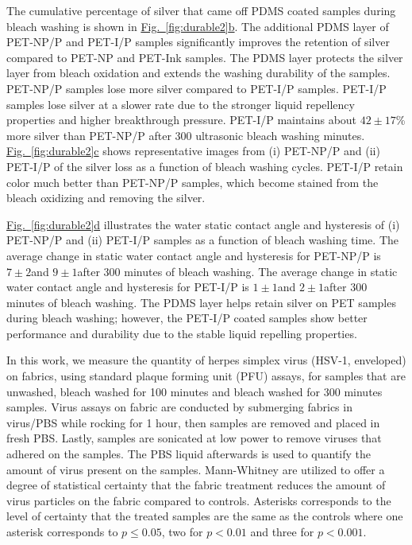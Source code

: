 \documentclass[journal=jacsat,manuscript=article]{achemso}
\newcommand{\figref}[2][]{\hyperref[#2]{Fig.~\ref{#2}#1}}
\begin{document}
The cumulative percentage of silver that came off PDMS coated samples during bleach washing is shown in \figref[b]{fig:durable2}. The additional PDMS layer of PET-NP/P and PET-I/P samples significantly improves the retention of silver compared to PET-NP and PET-Ink samples. The PDMS layer protects the silver layer from bleach oxidation and extends the washing durability of the samples. PET-NP/P samples lose more silver compared to PET-I/P samples. PET-I/P samples lose silver at a slower rate due to the stronger liquid repellency properties and higher breakthrough pressure. PET-I/P maintains about $42 \pm 17$\% more silver than PET-NP/P after 300 ultrasonic bleach washing minutes. 
\figref[c]{fig:durable2} shows representative images from (i) PET-NP/P and (ii) PET-I/P of the silver loss as a function of bleach washing cycles.  
PET-I/P retain color much better than PET-NP/P samples, which become stained from the bleach oxidizing and removing the silver.  

\figref[d]{fig:durable2} illustrates the water static contact angle and hysteresis of (i) PET-NP/P and (ii) PET-I/P samples as a function of bleach washing time. The average change in static water contact angle and hysteresis for %
PET-NP/P is $7 \pm 2$\degree and $9 \pm 1$\degree after 300 minutes of bleach washing. The average change in static water contact angle and hysteresis for 
PET-I/P is $1 \pm 1$\degree and $2 \pm 1$\degree after 300 minutes of bleach washing. The PDMS layer helps retain silver on PET samples during bleach washing; however, the PET-I/P coated samples show better performance and durability due to the stable liquid repelling properties. 

In this work, we measure the quantity of herpes simplex virus (HSV-1, enveloped) on fabrics, using standard plaque forming unit (PFU) assays, for samples that are unwashed, bleach washed for 100 minutes and bleach washed for 300 minutes samples.
Virus assays on fabric are conducted by submerging fabrics in virus/PBS while rocking for 1 hour, then samples are removed and placed in fresh PBS. Lastly, samples are sonicated at low power to remove viruses that adhered on the samples. The PBS liquid afterwards is used to quantify the amount of virus present on the samples. Mann-Whitney are utilized to offer a degree of statistical certainty that the fabric treatment reduces the amount of virus particles on the fabric compared to controls. Asterisks corresponds to the level of certainty that the treated samples are the same as the controls where one asterisk corresponds to $p \leq 0.05$, two for $p < 0.01$ and three for $p < 0.001$.
\end{document}
